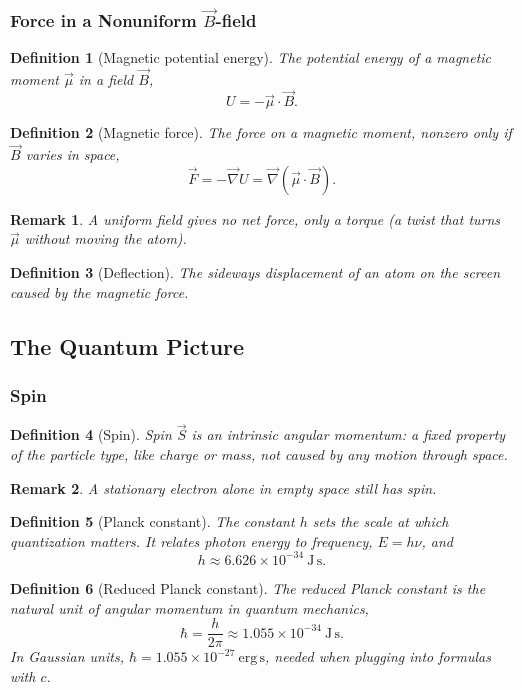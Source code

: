 \documentclass{article}
\newtheorem{definition}{Definition}
\newtheorem{remark}{Remark}
\begin{document}
\subsubsection{Force in a Nonuniform $\vec{B}$-field}
\begin{definition}[Magnetic potential energy]
    The potential energy of a magnetic moment $\vec{\mu}$ in a field $\vec{B}$,
    \begin{equation}
        U = -\vec{\mu}\cdot\vec{B}.
    \end{equation}
\end{definition}
\begin{definition}[Magnetic force]
    The force on a magnetic moment, nonzero only if $\vec{B}$ varies in space,
    \begin{equation}
        \vec{F} = -\vec{\nabla}U = \vec{\nabla}(\vec{\mu}\cdot\vec{B}).
    \end{equation}
\end{definition}
\begin{remark}
    A uniform field gives no net force, only a torque (a twist that turns $\vec{\mu}$ without moving the atom).
\end{remark}
\begin{definition}[Deflection]
    The sideways displacement of an atom on the screen caused by the magnetic force.
\end{definition}

\subsection{The Quantum Picture}
\subsubsection{Spin}
\begin{definition}[Spin]
    Spin $\vec{S}$ is an \emph{intrinsic} angular momentum: a fixed property of the particle type, like charge or mass, not caused by any motion through space.
\end{definition}
\begin{remark}
    A stationary electron alone in empty space still has spin.
\end{remark}
\begin{definition}[Planck constant]
    The constant $h$ sets the scale at which quantization matters. It relates photon energy to frequency, $E = h\nu$, and
    \[h \approx 6.626 \times 10^{-34}\ \mathrm{J\,s}.\]
\end{definition}
\begin{definition}[Reduced Planck constant]
    The reduced Planck constant is the natural unit of angular momentum in quantum mechanics,
    \[\hbar = \frac{h}{2\pi} \approx 1.055 \times 10^{-34}\ \mathrm{J\,s}.\]
    In Gaussian units, $\hbar = 1.055 \times 10^{-27}\ \mathrm{erg\,s}$, needed when plugging into formulas with $c$.
\end{definition}
\end{document}
